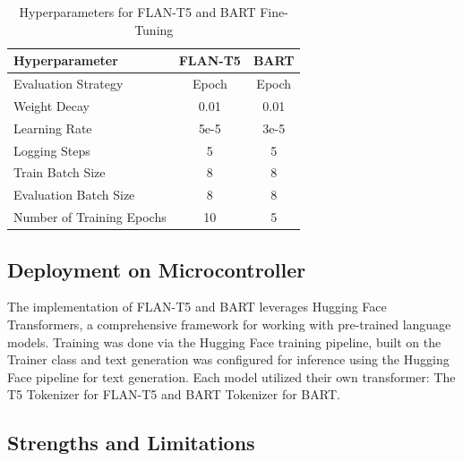 \documentclass[conference]{IEEEtran}
\begin{document}
\begin{table}[!ht]
    \centering
    \caption{Hyperparameters for FLAN-T5 and BART Fine-Tuning}
    \label{tab:hyperparams}
    \begin{tabular}{l|c|c}
        \toprule
        \textbf{Hyperparameter}         & \textbf{FLAN-T5}         & \textbf{BART} \\
        \midrule
        Evaluation Strategy             & Epoch                   & Epoch                     \\ 
        Weight Decay                    & 0.01                    & 0.01                      \\ 
        Learning Rate                   & 5e-5                    & 3e-5                      \\ 
        Logging Steps                   & 5                       & 5                         \\ 
        Train Batch Size                & 8                       & 8                         \\ 
        Evaluation Batch Size           & 8                       & 8                         \\ 
        Number of Training Epochs       & 10                      & 5                         \\ 
        \bottomrule
    \end{tabular}
\end{table}

\subsection{Deployment on Microcontroller}
The implementation of FLAN-T5 and BART leverages Hugging Face Transformers, a comprehensive framework for working with pre-trained language models.
Training was done via the Hugging Face training pipeline, built on the Trainer class and text generation was configured for inference using the Hugging Face pipeline for text generation.
Each model utilized their own transformer: The T5 Tokenizer \cite{b10} for FLAN-T5 and BART Tokenizer \cite{b11} for BART.


\subsection{Strengths and Limitations}
\end{document}
